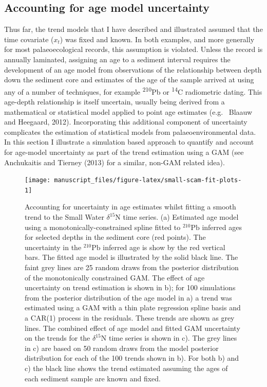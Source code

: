\documentclass[12pt,]{article}
\begin{document}
\subsection{Accounting for age model
uncertainty}\label{accounting-for-age-model-uncertainty}

Thus far, the trend models that I have described and illustrated assumed
that the time covariate (\(x_t\)) was fixed and known. In both examples,
and more generally for most palaeoecological records, this assumption is
violated. Unless the record is annually laminated, assigning an age to a
sediment interval requires the development of an age model from
observations of the relationship between depth down the sediment core
and estimates of the age of the sample arrived at using any of a number
of techniques, for example \textsuperscript{210}Pb or
\textsuperscript{14}C radiometric dating. This age-depth relationship is
itself uncertain, usually being derived from a mathematical or
statistical model applied to point age estimates (e.g.~ Blaauw and
Heegaard, 2012). Incorporating this additional component of uncertainty
complicates the estimation of statistical models from
palaeoenvironmental data. In this section I illustrate a simulation
based approach to quantify and account for age-model uncertainty as part
of the trend estimation using a GAM (see Anchukaitis and Tierney (2013)
for a similar, non-GAM related idea).

\begin{figure}

{\centering \texttt{[image: manuscript\_files/figure-latex/small-scam-fit-plots-1]} 

}

\caption{Accounting for uncertainty in age estimates whilst fitting a smooth trend to the Small Water $\delta^{15}\text{N}$ time series. (a) Estimated age model using a monotonically-constrained spline fitted to ${}^{210}\text{Pb}$ inferred ages for selected depths in the sediment core (red points). The uncertainty in the ${}^{210}\text{Pb}$ inferred age is show by the red vertical bars. The fitted age model is illustrated by the solid black line. The faint grey lines are 25 random draws from the posterior distribution of the monotonically constrained GAM. The effect of age uncertainty on trend estimation is shown in b); for 100 simulations from the posterior distribution of the age model in a) a trend was estimated using a GAM with a thin plate regression spline basis and a CAR(1) process in the residuals. These trends are shown as grey lines. The combined effect of age model and fitted GAM uncertainty on the trends for the $\delta^{15}\text{N}$ time series is shown in c). The grey lines in c) are based on 50 random draws from the model posterior distribution for each of the 100 trends shown in b). For both b) and c) the black line shows the trend estimated assuming the ages of each sediment sample are known and fixed.}\label{fig:small-scam-fit-plots}
\end{figure}
\end{document}
